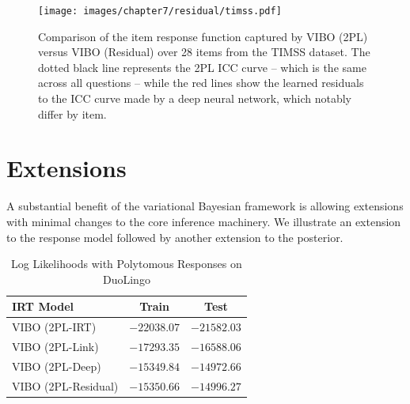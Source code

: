 \begin{figure}
    \centering
    \texttt{[image: images/chapter7/residual/timss.pdf]}
    \caption{Comparison of the item response function captured by VIBO (2PL) versus VIBO (Residual) over 28 items from the TIMSS dataset. The dotted black line represents the 2PL ICC curve -- which is the same across all questions -- while the red lines show the learned residuals to the ICC curve made by a deep neural network, which notably differ by item.}
    \label{fig:residual_timss}
\end{figure}


\section{Extensions}

A substantial benefit of the variational Bayesian framework is allowing extensions with minimal changes to the core inference machinery. We illustrate an extension to the response model followed by another extension to the posterior.

\begin{table}[h!]
    \caption{Log Likelihoods with Polytomous Responses on DuoLingo}
    \label{table:duolingo:continuous}
    \begin{center}
    \begin{tabular}{lcc}
    \hline
    IRT Model & Train & Test \\
    \hline
    VIBO (2PL-IRT) &  $-22038.07$ & $-21582.03$ \\
    VIBO (2PL-Link) & $-17293.35$ & $-16588.06$ \\
    VIBO (2PL-Deep) & $\mathbf{-15349.84}$ & $\mathbf{-14972.66}$ \\
    VIBO (2PL-Residual) & $-15350.66$ & $-14996.27$ \\
    \hline
    \end{tabular}
    \end{center}
\end{table}

